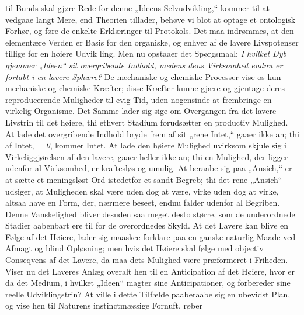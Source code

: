 \documentclass[12pt]{book}
\newcommand{\opage}[1]{\marginnote{\footnotesize\textit{[#1]}}}
\begin{document}
til Bunds skal gjøre Rede for denne „Ideens Selvudvikling,“ kommer til at vedgaae langt
Mere, end Theorien tillader, behøve vi blot at optage et ontologisk Forhør, og føre de
enkelte Erklæringer til Protokols. Det maa indrømmes, at den elementære Verden er Basis for
den organiske, og enhver af de lavere Livspotenser tillige for en høiere Udvik
\opage{224} ling. Men nu opstaaer det Spørgsmaal: \emph{I hvilket Dyb gjemmer „Ideen“ sit overgribende
Indhold, medens dens Virksomhed endnu er fortabt i en lavere Sphære?} De mechaniske og
chemiske Processer vise os kun mechaniske og chemiske Kræfter; disse Kræfter kunne gjære og
gjentage deres reproducerende Muligheder til evig Tid, uden nogensinde at frembringe en
virkelig Organisme.
Det Samme lader sig sige om Overgangen fra det lavere Livstrin til det høiere, thi ethvert
Stadium forudsætter en productiv Mulighed. At lade det overgribende Indhold bryde frem af
sit „rene Intet,“ gaaer ikke an; thi af Intet, = \textit{0}, kommer Intet.
At lade den høiere Mulighed uvirksom skjule sig i Virkeliggjørelsen af den lavere, gaaer
heller ikke an; thi en Mulighed, der ligger udenfor al Virksomhed, er kraftesløs og umulig.
At beraabe sig paa „Ansich,“ er at sætte et meningsløst Ord istedetfor et sandt Begreb; thi
det rene „Ansich“ udsiger, at Muligheden skal være uden dog at være, virke uden dog at
virke, altsaa have en Form, der, nærmere beseet, endnu falder udenfor al Begriben. Denne
Vanskelighed bliver desuden saa meget desto større, som de underordnede Stadier aabenbart
ere til for de overordnedes Skyld. At det Lavere kan blive en Følge af det Høiere, lader sig
maaskee forklare paa en ganske naturlig Maade ved Afmagt og blind Opløsning; men hvis det
Høiere skal følge med objectiv Conseqvens af det Lavere, da maa dets Mulighed være
præformeret i Friheden. Viser nu det Laveres Anlæg overalt hen til en Anticipation af det
Høiere, hvor er da det Medium, i hvilket „Ideen“ magter sine Anticipationer, og forbereder
sine reelle Udviklingstrin? At ville i dette Tilfælde paaberaabe sig en ubevidst Plan, og
vise hen til Naturens instinctmæssige Fornuft, røber
\end{document}
